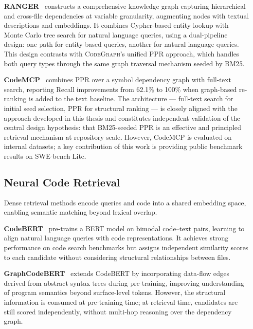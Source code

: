 \textbf{RANGER}~\cite{ranger2025} constructs a comprehensive knowledge graph capturing
hierarchical and cross-file dependencies at variable granularity, augmenting nodes with
textual descriptions and embeddings.
It combines Cypher-based entity lookup with Monte Carlo tree search for natural language
queries, using a dual-pipeline design: one path for entity-based queries, another for
natural language queries.
This design contrasts with \textsc{CodeGraph}'s unified PPR approach, which handles
both query types through the same graph traversal mechanism seeded by BM25.

\textbf{CodeMCP}~\cite{codemcp} combines PPR over a symbol dependency graph with
full-text search, reporting Recall improvements from 62.1\% to 100\% when graph-based
re-ranking is added to the text baseline.
The architecture — full-text search for initial seed selection, PPR for structural
ranking — is closely aligned with the approach developed in this thesis and constitutes
independent validation of the central design hypothesis: that BM25-seeded PPR is an
effective and principled retrieval mechanism at repository scale.
However, CodeMCP is evaluated on internal datasets; a key contribution of this work
is providing public benchmark results on SWE-bench Lite.

\subsection{Neural Code Retrieval}
\label{sec:neural-retrieval-related}

Dense retrieval methods encode queries and code into a shared embedding space, enabling
semantic matching beyond lexical overlap.

\textbf{CodeBERT}~\cite{codebert} pre-trains a BERT model on bimodal code--text pairs,
learning to align natural language queries with code representations.
It achieves strong performance on code search benchmarks but assigns independent
similarity scores to each candidate without considering structural relationships between
files.

\textbf{GraphCodeBERT}~\cite{graphcodebert} extends CodeBERT by incorporating data-flow
edges derived from abstract syntax trees during pre-training, improving understanding of
program semantics beyond surface-level tokens.
However, the structural information is consumed at pre-training time; at retrieval time,
candidates are still scored independently, without multi-hop reasoning over the dependency
graph.


